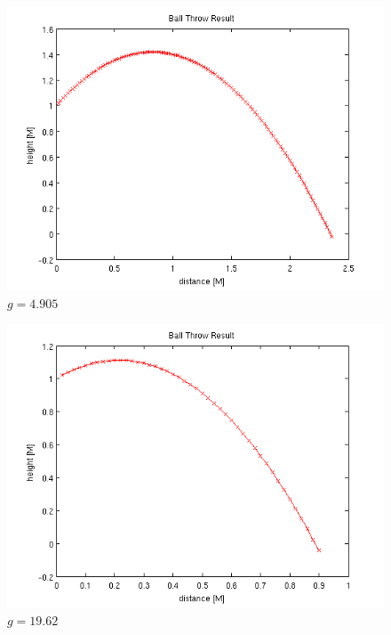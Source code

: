 \begin{figure}
\centering
\includegraphics[scale=0.75]{lessgravity}
\caption{$g = 4.905$ \label{lessg}}
\end{figure}

\begin{figure}
\centering
\includegraphics[scale=0.75]{moargravity}
\caption{$g = 19.62$ \label{moarg}}
\end{figure}

